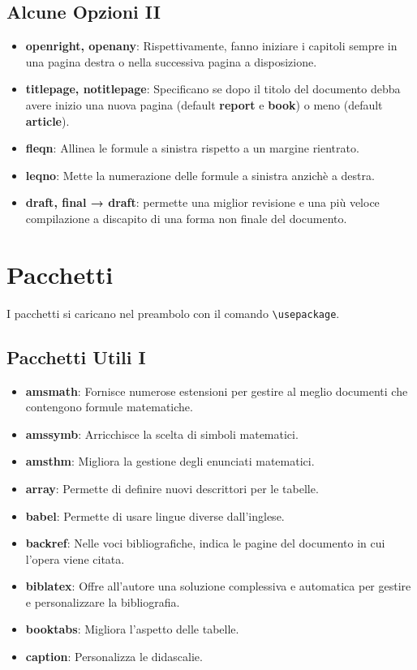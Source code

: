 \documentclass{article}
\begin{document}
            \subsection{Alcune Opzioni II}
                \begin{itemize}
                    \item \textbf{openright, openany}: Rispettivamente, fanno iniziare i capitoli sempre in una pagina destra o nella successiva pagina a disposizione.
                    \item \textbf{titlepage, notitlepage}: Specificano se dopo il titolo del documento debba avere inizio una nuova pagina (default \textbf{report} e \textbf{book}) o meno (default \textbf{article}).
                    \item \textbf{fleqn}: Allinea le formule a sinistra rispetto a un margine rientrato.
                    \item \textbf{leqno}: Mette la numerazione delle formule a sinistra anzichè a destra.
                    \item \textbf{draft, final → draft}: permette una miglior revisione e una più veloce compilazione a discapito di una forma non finale del documento.
                \end{itemize}

        \section{Pacchetti}
            I pacchetti si caricano nel preambolo con il comando \verb!\usepackage!.

            \subsection{Pacchetti Utili I}
                \begin{itemize}
                    \item \textbf{amsmath}: Fornisce numerose estensioni per gestire al meglio documenti che contengono formule matematiche.
                    \item \textbf{amssymb}: Arricchisce la scelta di simboli matematici.
                    \item \textbf{amsthm}: Migliora la gestione degli enunciati matematici.
                    \item \textbf{array}: Permette di definire nuovi descrittori per le tabelle.
                    \item \textbf{babel}: Permette di usare lingue diverse dall'inglese.
                    \item \textbf{backref}: Nelle voci bibliografiche, indica le pagine del documento in cui l'opera viene citata.
                    \item \textbf{biblatex}: Offre all'autore una soluzione complessiva e automatica per gestire e personalizzare la bibliografia.
                    \item \textbf{booktabs}: Migliora l'aspetto delle tabelle.
                    \item \textbf{caption}: Personalizza le didascalie.
                \end{itemize}
\end{document}
